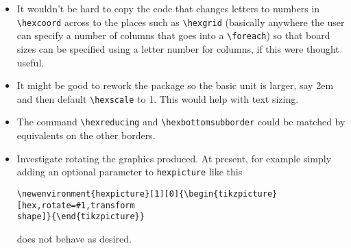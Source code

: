 \documentclass[a4paper,12pt]{article}
\begin{document}
    \begin{itemize}
        \item It wouldn't be hard to copy the code that changes letters to numbers in \verb|\hexcoord| across to the places such as \verb|\hexgrid| (basically anywhere the user can specify a number of columns that goes into a \verb|\foreach|) so that board sizes can be specified using a letter number for columns, if this were thought useful.
        
        \item It might be good to rework the package so the basic unit is larger, say 2em and then default \verb|\hexscale| to 1. This would help with text sizing.
    
        \item The command \verb|\hexreducing| and \verb|\hexbottomsubborder| could be matched by equivalents on the other borders.
        
        \item Investigate rotating the graphics produced. At present, for example simply adding an optional parameter to \verb|hexpicture| like this  
        
        \begin{verbatim}\newenvironment{hexpicture}[1][0]{\begin{tikzpicture}[hex,rotate=#1,transform
shape]}{\end{tikzpicture}}\end{verbatim}
        
        does not behave as desired.
    \end{itemize}
    
\end{document}
